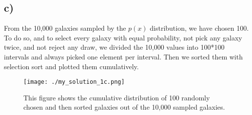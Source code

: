 \subsection*{c)}
From the 10,000 galaxies sampled by the \( p(x) \) distribution, we have chosen 100. To do so, and to select every galaxy with equal probability, not pick any galaxy twice, and not reject any draw, we divided the 10,000 values into 100*100 intervals and always picked one element per interval. Then we sorted them with selection sort and plotted them cumulatively.

\begin{figure}
    \centering
    \texttt{[image: ./my\_solution\_1c.png]}
    \caption{This figure shows the cumulative distribution of 100 randomly chosen and then sorted galaxies out of the 10,000 sampled galaxies.}
    \label{fig:enter-label}
\end{figure}


